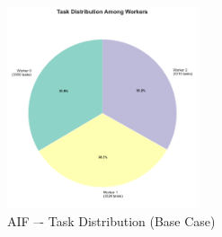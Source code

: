 \begin{figure}[h]
    \centering
    \includegraphics[width=0.5\textwidth]{img/results/basic/active_inference_relative_control_task_distribution_pie.pdf}
    \caption{AIF –- Task Distribution (Base Case)}
\end{figure}


